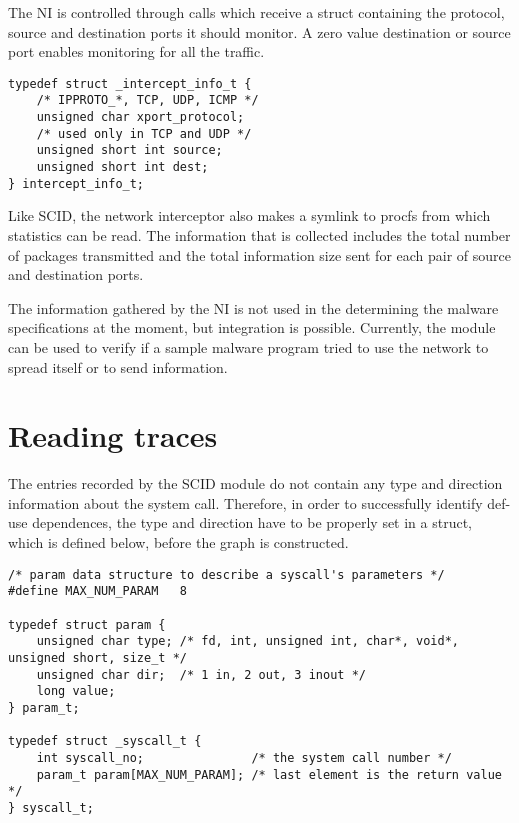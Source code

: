 The NI is controlled through  calls which receive a  struct containing the protocol, source and destination ports it should monitor. A zero value destination or source port enables monitoring for all the traffic.

\lstset{language=C,caption=parameter data structures,label=lst:param-struct}
\begin{lstlisting}
typedef struct _intercept_info_t {
	/* IPPROTO_*, TCP, UDP, ICMP */
	unsigned char xport_protocol;
	/* used only in TCP and UDP */
	unsigned short int source;
	unsigned short int dest;
} intercept_info_t;
\end{lstlisting}

Like SCID, the network interceptor also makes a symlink to procfs from which statistics can be read. The information that is collected includes the total number of packages transmitted and the total information size sent for each pair of source and destination ports.

The information gathered by the NI is not used in the determining the malware specifications at the moment, but integration is possible. Currently, the module can be used to verify if a sample malware program tried to use the network to spread itself or to send information.

\section{Reading traces}
\label{fourth:read-traces}

The entries recorded by the SCID module do not contain any type and direction information about the system call. Therefore, in order to successfully identify def-use dependences, the type and direction have to be properly set in a  struct, which is defined below, before the graph is constructed.

\lstset{language=C,caption=parameter data structures,label=lst:param-struct}
\begin{lstlisting}
/* param data structure to describe a syscall's parameters */
#define MAX_NUM_PARAM	8

typedef struct param {
	unsigned char type; /* fd, int, unsigned int, char*, void*, unsigned short, size_t */
	unsigned char dir;  /* 1 in, 2 out, 3 inout */
	long value;
} param_t;

typedef struct _syscall_t {
	int syscall_no;               /* the system call number */
	param_t param[MAX_NUM_PARAM]; /* last element is the return value */
} syscall_t;
\end{lstlisting}

